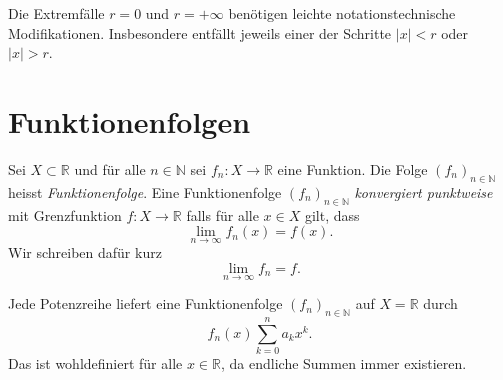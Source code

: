\documentclass[../main.tex]{subfiles}
\begin{document}
\begin{remark}
  Die Extremfälle $r = 0$ und $r = +\infty$ benötigen leichte notationstechnische
  Modifikationen. Insbesondere entfällt jeweils einer der Schritte
  $|x| < r$ oder $|x| > r$.
\end{remark}

\section{Funktionenfolgen}\label{sec:sequences-of-funs}
\begin{definition}
  Sei $X \subset \mathbb{R}$ und für alle $n \in \mathbb{N}$ sei $f_n \colon X \to \mathbb{R}$ 
  eine Funktion. Die Folge ${(f_{n})}_{n \in \mathbb{N}}$ heisst
  \emph{Funktionenfolge}.
  Eine Funktionenfolge ${(f_{n})}_{n \in \mathbb{N}}$ \emph{konvergiert punktweise}
  mit Grenzfunktion $f \colon X \to \mathbb{R}$ falls für alle $x \in X$ 
  gilt, dass
  \[
    \lim_{n \to \infty} f_n(x) = f(x).
  \]
  Wir schreiben dafür kurz
  \[
    \lim_{n \to \infty} f_n = f.
  \]
\end{definition}

\begin{remark}
  Jede Potenzreihe liefert eine Funktionenfolge ${(f_{n})}_{n \in \mathbb{N}}$ auf $X = \mathbb{R}$ 
  durch
  \[
    f_n(x) \sum_{k=0}^{n} a_k x^k.
  \]
  Das ist wohldefiniert für alle $x \in \mathbb{R}$, da endliche Summen immer existieren.
\end{remark}
\end{document}
